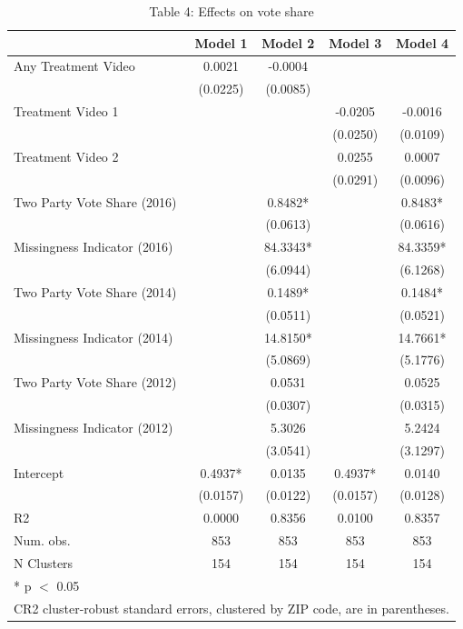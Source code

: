 \begin{table}
\centering
\caption{Table 4: Effects on vote share}
\centering
\begin{tabular}[t]{lcccc}
\toprule
  & Model 1 & Model 2 & Model 3 & Model 4\\
\midrule
Any Treatment Video & 0.0021 & -0.0004 &  & \\
 & (0.0225) & (0.0085) &  & \\
Treatment Video 1 &  &  & -0.0205 & -0.0016\\
 &  &  & (0.0250) & (0.0109)\\
Treatment Video 2 &  &  & 0.0255 & 0.0007\\
 &  &  & (0.0291) & (0.0096)\\
Two Party Vote Share (2016) &  & 0.8482* &  & 0.8483*\\
 &  & (0.0613) &  & (0.0616)\\
Missingness Indicator (2016) &  & 84.3343* &  & 84.3359*\\
 &  & (6.0944) &  & (6.1268)\\
Two Party Vote Share (2014) &  & 0.1489* &  & 0.1484*\\
 &  & (0.0511) &  & (0.0521)\\
Missingness Indicator (2014) &  & 14.8150* &  & 14.7661*\\
 &  & (5.0869) &  & (5.1776)\\
Two Party Vote Share (2012) &  & 0.0531 &  & 0.0525\\
 &  & (0.0307) &  & (0.0315)\\
Missingness Indicator (2012) &  & 5.3026 &  & 5.2424\\
 &  & (3.0541) &  & (3.1297)\\
Intercept & 0.4937* & 0.0135 & 0.4937* & 0.0140\\
 & (0.0157) & (0.0122) & (0.0157) & (0.0128)\\
\midrule
R2 & 0.0000 & 0.8356 & 0.0100 & 0.8357\\
Num. obs. & 853 & 853 & 853 & 853\\
N Clusters & 154 & 154 & 154 & 154\\
\bottomrule
\multicolumn{5}{l}{\rule{0pt}{1em}* p $<$ 0.05}\\
\multicolumn{5}{l}{\rule{0pt}{1em}CR2 cluster-robust standard errors, clustered by ZIP code, are in parentheses.}\\
\end{tabular}
\end{table}
